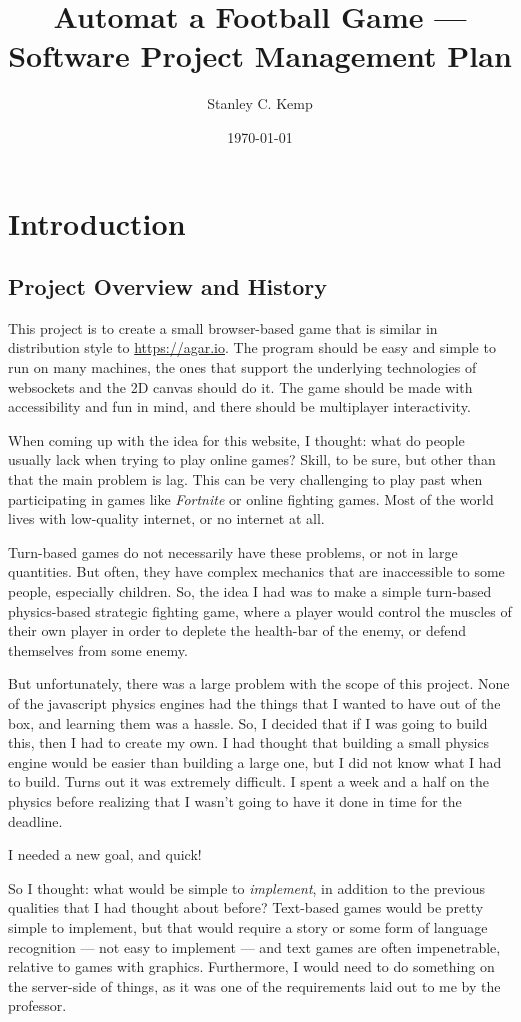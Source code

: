 \documentclass[11pt]{article}
\author{Stanley C. Kemp}
\date{\today}
\title{Automat a Football Game --- Software Project Management Plan}
\begin{document}
\maketitle
\section{Introduction}
\label{sec:orge253e25}
\subsection{Project Overview and History}
\label{sec:orgcd7c887}
 This project is to create a small browser-based game that is similar in distribution style to \url{https://agar.io}.
The program should be easy and simple to run on many machines, the ones that support the underlying technologies 
of websockets and the 2D canvas should do it. The game should be made with accessibility and fun in mind, and there 
should be multiplayer interactivity.

When coming up with the idea for this website,
I thought: what do people usually lack when trying to play online games? Skill, to be sure, but other than that
the main problem is lag. This can be very challenging to play past when participating in games like \emph{Fortnite} or
online fighting games. Most of the world lives with low-quality internet, or no internet at all. 

Turn-based games do not necessarily have these problems, or not in large quantities. But often, they have complex
mechanics that are inaccessible to some people, especially children. So, the idea I had was to make 
a simple turn-based physics-based strategic fighting game, where a player would control the muscles of their own
player in order to deplete the health-bar of the enemy, or defend themselves from some enemy.

But unfortunately, there was a large problem with the scope of this project.
None of the javascript physics engines had the things that I wanted to have out of the box,
and learning them was a hassle. So, I decided that if I was going to build this, then I had to create my own.
I had thought that building a small physics engine would be easier than building a large one, but I did not know
what I had to build. Turns out it was extremely difficult. I spent a week and a half on the physics before realizing
that I wasn't going to have it done in time for the deadline.

I needed a new goal, and quick!

So I thought: what would be simple to \emph{implement}, in addition to the previous qualities that I had thought about
before? Text-based games would be pretty simple to implement, but that would require a story or some form of
language recognition --- not easy to implement --- and text games are often impenetrable, relative to games with
graphics. Furthermore, I would need to do something on the server-side of things, as it was one of the requirements
laid out to me by the professor.
\end{document}
